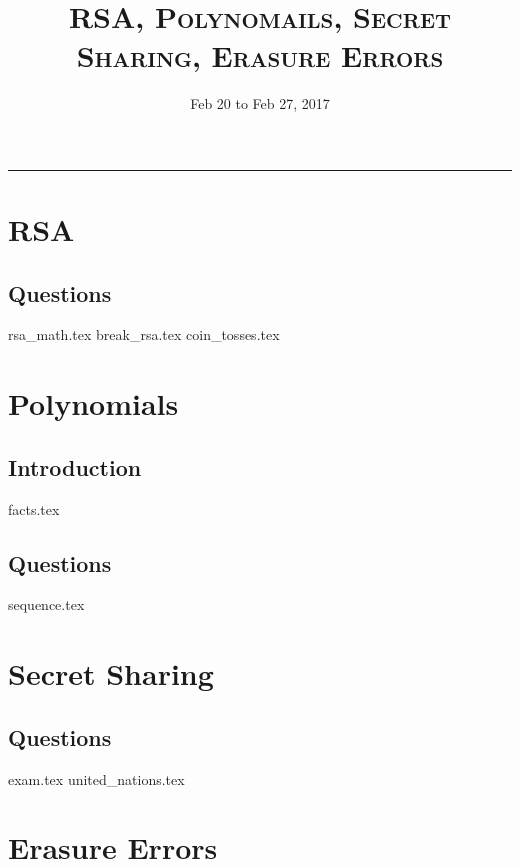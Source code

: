 \documentclass{exam}
\title{\textsc{RSA, Polynomails, Secret Sharing, Erasure Errors}}
\date{Feb 20 to Feb 27, 2017}
\begin{document}
\maketitle
\rule{\textwidth}{0.15em}
\fontsize{12}{15}\selectfont
\thispagestyle{empty}

\section{RSA}
\subsection{Questions}
\begin{questions}
{rsa_math.tex}
{break_rsa.tex}
{coin_tosses.tex}
\end{questions}


\section{Polynomials}
\subsection{Introduction}
{facts.tex}
\subsection{Questions}
\begin{questions}
{sequence.tex}
\end{questions}

\section{Secret Sharing}
\subsection{Questions}
\begin{questions}
{exam.tex}
{united_nations.tex}
\end{questions}

\section{Erasure Errors}
\end{document}
